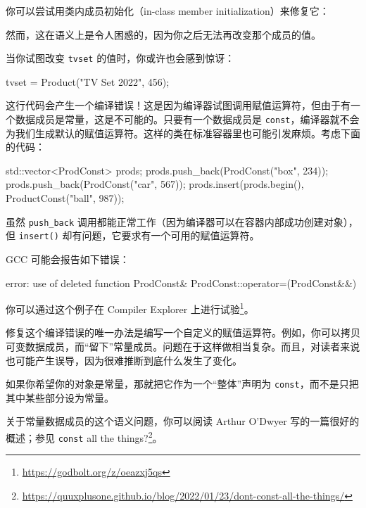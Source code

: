 你可以尝试用类内成员初始化（in-class member initialization）来修复它：

\begin{codebox}[cpp]
private:
std::string name_;
const unsigned id_ { 0 };
};
\end{codebox}

然而，这在语义上是令人困惑的，因为你之后无法再改变那个成员的值。

当你试图改变 \texttt{tvset} 的值时，你或许也会感到惊讶：

\begin{codebox}[cpp]
tvset = Product("TV Set 2022", 456);
\end{codebox}

这行代码会产生一个编译错误！这是因为编译器试图调用赋值运算符，但由于有一个数据成员是常量，这是不可能的。只要有一个数据成员是 \texttt{const}，编译器就不会为我们生成默认的赋值运算符。这样的类在标准容器里也可能引发麻烦。考虑下面的代码：

\begin{codebox}[cpp]
std::vector<ProdConst> prods;
prods.push_back(ProdConst("box", 234));
prods.push_back(ProdConst("car", 567));
prods.insert(prods.begin(), ProductConst("ball", 987));
\end{codebox}

虽然 \texttt{push\_back} 调用都能正常工作（因为编译器可以在容器内部成功创建对象），但 \texttt{insert()} 却有问题，它要求有一个可用的赋值运算符。

GCC 可能会报告如下错误：

\begin{codebox}[cpp]
error: use of deleted function ProdConst& ProdConst::operator=(ProdConst&&)
\end{codebox}

你可以通过这个例子在 Compiler Explorer 上进行试验\footnote{\url{https://godbolt.org/z/oeazxj5qs}}。

修复这个编译错误的唯一办法是编写一个自定义的赋值运算符。例如，你可以拷贝可变数据成员，而“留下”常量成员。问题在于这样做相当复杂。而且，对读者来说也可能产生误导，因为很难推断到底什么发生了变化。

如果你希望你的对象是常量，那就把它作为一个“整体”声明为 \texttt{const}，而不是只把其中某些部分设为常量。

\begin{myInfoBox}
关于常量数据成员的这个语义问题，你可以阅读 Arthur O'Dwyer 写的一篇很好的概述；参见 \texttt{const} all the things?\footnote{\url{https://quuxplusone.github.io/blog/2022/01/23/dont-const-all-the-things/}}。
\end{myInfoBox}

